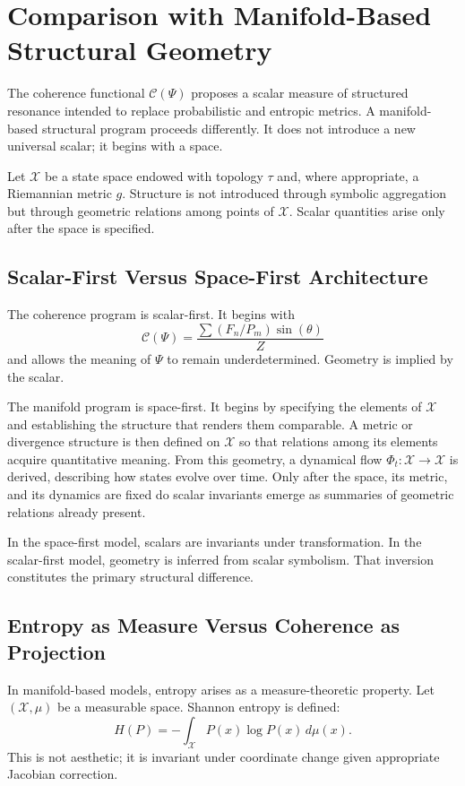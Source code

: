 \documentclass[12pt]{article}
\begin{document}
\section{Comparison with Manifold-Based Structural Geometry}

The coherence functional $\mathcal{C}(\Psi)$ proposes a scalar measure of structured resonance intended to replace probabilistic and entropic metrics. A manifold-based structural program proceeds differently. It does not introduce a new universal scalar; it begins with a space.

Let $\mathcal{X}$ be a state space endowed with topology $\tau$ and, where appropriate, a Riemannian metric $g$. Structure is not introduced through symbolic aggregation but through geometric relations among points of $\mathcal{X}$. Scalar quantities arise only after the space is specified.

\subsection{Scalar-First Versus Space-First Architecture}

The coherence program is scalar-first. It begins with
\[
  \mathcal{C}(\Psi) = \frac{\sum (F_n / P_m)\sin(\theta)}{Z}
\]
and allows the meaning of $\Psi$ to remain underdetermined. Geometry is implied by the scalar.

The manifold program is space-first. It begins by specifying the elements of $\mathcal{X}$ and establishing the structure that renders them comparable. A metric or divergence structure is then defined on $\mathcal{X}$ so that relations among its elements acquire quantitative meaning. From this geometry, a dynamical flow $\Phi_t : \mathcal{X} \to \mathcal{X}$ is derived, describing how states evolve over time. Only after the space, its metric, and its dynamics are fixed do scalar invariants emerge as summaries of geometric relations already present.

In the space-first model, scalars are invariants under transformation. In the scalar-first model, geometry is inferred from scalar symbolism. That inversion constitutes the primary structural difference.

\subsection{Entropy as Measure Versus Coherence as Projection}

In manifold-based models, entropy arises as a measure-theoretic property. Let $(\mathcal{X}, \mu)$ be a measurable space. Shannon entropy is defined:
\[
  H(P) = -\int_{\mathcal{X}} P(x)\log P(x)\, d\mu(x).
\]
This is not aesthetic; it is invariant under coordinate change given appropriate Jacobian correction.
\end{document}

